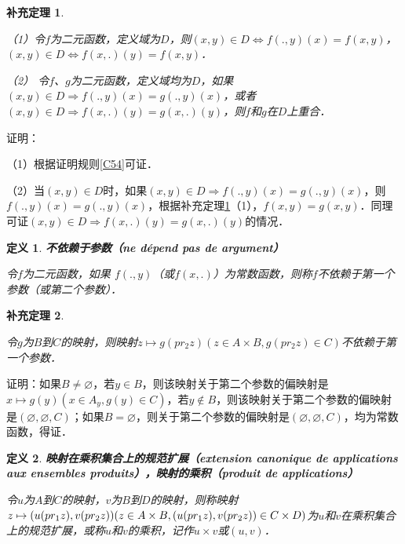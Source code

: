 \documentclass[12pt, a4paper, oneside]{book}
\newtheorem{cor}{补充定理}
\newtheorem{de}{定义}
\begin{document}
			\begin{cor}\label{cor82}
				\hfill\par
				（1）令$f$为二元函数，定义域为$D$，则$(x, y)\in D\Leftrightarrow f(., y)(x)=f(x, y)$，$(x, y)\in D\Leftrightarrow f(x, .)(y)=f(x, y)$．
				\par
				（2）	令$f$、$g$为二元函数，定义域均为$D$，如果$(x, y)\in D\Rightarrow f(., y)(x)=g(., y)(x)$，或者$(x, y)\in D\Rightarrow f(x, .)(y)=g(x, .)(y)$，则$f$和$g$在$D$上重合．
			\end{cor}
			证明：
			\par
			（1）根据证明规则\ref{C54}可证．
			\par
			（2）当$(x, y)\in D$时，如果$(x, y)\in D\Rightarrow f(., y)(x)=g(., y)(x)$，则$f(., y)(x)=g(., y)(x)$，根据补充定理\ref{cor82}（1），$f(x, y)=g(x, y)$．同理可证$(x, y)\in D\Rightarrow f(x, .)(y)=g(x, .)(y)$的情况．			

			\begin{de}
				\textbf{不依赖于参数（ne dépend pas de argument）}
				\par
				令$f$为二元函数，如果 $f(., y)$（或$f(x, .)$）为常数函数，则称$f$不依赖于第一个参数（或第二个参数）．
			\end{de}
			
			\begin{cor}\label{cor83}
				\hfill\par
				令$g$为$B$到$C$的映射，则映射$z\mapsto g(pr_2z)(z\in A\times B, g(pr_2z)\in C)$不依赖于第一个参数．
			\end{cor}
			证明：如果$B\neq \varnothing$，若$y\in B$，则该映射关于第二个参数的偏映射是$x\mapsto g(y)(x\in A_y, g(y)\in C)$，若$y\notin B$，则该映射关于第二个参数的偏映射是$(\varnothing, \varnothing, C)$；如果$B=\varnothing$，则关于第二个参数的偏映射是$(\varnothing, \varnothing, C)$，均为常数函数，得证．

			\begin{de}
				\textbf{映射在乘积集合上的规范扩展（extension canonique de applications aux ensembles produits），映射的乘积（produit de applications）}
				\par
				令$u$为$A$到$C$的映射，$v$为$B$到$D$的映射，则称映射$z\mapsto (u(pr_1z), v(pr_2z))(z\in A\times B, \\(u(pr_1z), v(pr_2z))\in C\times D)$为$u$和$v$在乘积集合上的规范扩展，或称$u$和$v$的乘积，记作$u\times v$或$(u, v)$．
			\end{de}
\end{document}
